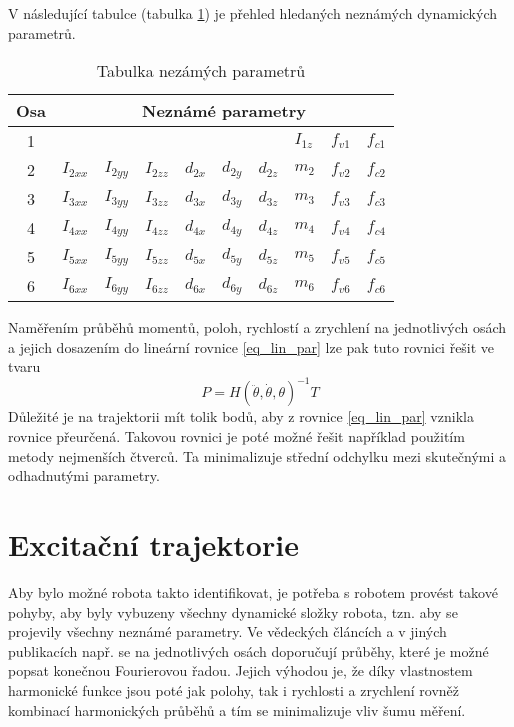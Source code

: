 V následující tabulce (tabulka \ref{tab_hled_param}) je přehled hledaných neznámých dynamických parametrů.   
\\

\begin{table}[htbp]
  \centering
  \caption{Tabulka nezámých parametrů}
    \begin{tabular}{c|lllllllll}
    \multicolumn{1}{c|}{Osa} & \multicolumn{9}{c}{Neznámé parametry}  \\
    \hline
    1 &       	  &	          &           &          &          &          & $I_{1z}$& $f_{v1}$ & $f_{c1}$ \\
    2 & $I_{2xx}$ & $I_{2yy}$ & $I_{2zz}$ & $d_{2x}$ & $d_{2y}$ & $d_{2z}$ & $m_{2}$ & $f_{v2}$ & $f_{c2}$ \\
    3 & $I_{3xx}$ & $I_{3yy}$ & $I_{3zz}$ & $d_{3x}$ & $d_{3y}$ & $d_{3z}$ & $m_{3}$ & $f_{v3}$ & $f_{c3}$ \\
    4 & $I_{4xx}$ & $I_{4yy}$ & $I_{4zz}$ & $d_{4x}$ & $d_{4y}$ & $d_{4z}$ & $m_{4}$ & $f_{v4}$ & $f_{c4}$ \\
    5 & $I_{5xx}$ & $I_{5yy}$ & $I_{5zz}$ & $d_{5x}$ & $d_{5y}$ & $d_{5z}$ & $m_{5}$ & $f_{v5}$ & $f_{c5}$ \\
    6 & $I_{6xx}$ & $I_{6yy}$ & $I_{6zz}$ & $d_{6x}$ & $d_{6y}$ & $d_{6z}$ & $m_{6}$ & $f_{v6}$ & $f_{c6}$ \\
    \end{tabular}%
  \label{tab_hled_param}%
\end{table}%


Naměřením průběhů momentů, poloh, rychlostí a zrychlení na jednotlivých osách a jejich dosazením do lineární rovnice \ref{eq_lin_par} lze pak tuto rovnici řešit ve tvaru 
\begin{equation}
P = H(\ddot{\theta},\dot{\theta},\theta)^{-1}T
\label{eq_lin_par_inv}
\end{equation}
Důležité je na trajektorii mít tolik bodů, aby z rovnice \ref{eq_lin_par} vznikla rovnice přeurčená. Takovou rovnici je poté možné řešit například použitím metody nejmenších čtverců. Ta minimalizuje střední odchylku mezi skutečnými a odhadnutými parametry. 

\section{Excitační trajektorie}

Aby bylo možné robota takto identifikovat, je potřeba s robotem provést takové pohyby, aby byly vybuzeny všechny dynamické složky robota, tzn. aby se projevily všechny neznámé parametry. Ve vědeckých článcích a v jiných publikacích např. \cite{clos_dyn_par}\cite{dyn_mod_ind}\cite{dyn_ind_mits} se na jednotlivých osách doporučují průběhy, které je možné popsat konečnou Fourierovou řadou. Jejich výhodou je, že díky vlastnostem harmonické funkce jsou poté jak polohy, tak i rychlosti a zrychlení rovněž kombinací harmonických průběhů a tím se minimalizuje vliv šumu měření. 

